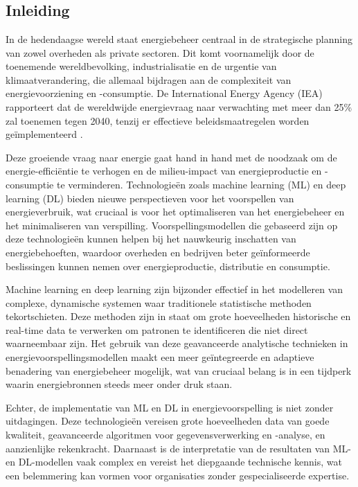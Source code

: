 \chapter{}%
\label{ch:stand-van-zaken}

\section{Inleiding}

In de hedendaagse wereld staat energiebeheer centraal in de strategische planning van zowel overheden als private sectoren. Dit komt voornamelijk door de toenemende wereldbevolking, industrialisatie en de urgentie van klimaatverandering, die allemaal bijdragen aan de complexiteit van energievoorziening en -consumptie. De International Energy Agency (IEA) rapporteert dat de wereldwijde energievraag naar verwachting met meer dan 25\% zal toenemen tegen 2040, tenzij er effectieve beleidsmaatregelen worden geïmplementeerd \autocite{Reddy_2023}.

Deze groeiende vraag naar energie gaat hand in hand met de noodzaak om de energie-efficiëntie te verhogen en de milieu-impact van energieproductie en -consumptie te verminderen. Technologieën zoals machine learning (ML) en deep learning (DL) bieden nieuwe perspectieven voor het voorspellen van energieverbruik, wat cruciaal is voor het optimaliseren van het energiebeheer en het minimaliseren van verspilling. Voorspellingsmodellen die gebaseerd zijn op deze technologieën kunnen helpen bij het nauwkeurig inschatten van energiebehoeften, waardoor overheden en bedrijven beter geïnformeerde beslissingen kunnen nemen over energieproductie, distributie en consumptie.

Machine learning en deep learning zijn bijzonder effectief in het modelleren van complexe, dynamische systemen waar traditionele statistische methoden tekortschieten. Deze methoden zijn in staat om grote hoeveelheden historische en real-time data te verwerken om patronen te identificeren die niet direct waarneembaar zijn. Het gebruik van deze geavanceerde analytische technieken in energievoorspellingsmodellen maakt een meer geïntegreerde en adaptieve benadering van energiebeheer mogelijk, wat van cruciaal belang is in een tijdperk waarin energiebronnen steeds meer onder druk staan.

Echter, de implementatie van ML en DL in energievoorspelling is niet zonder uitdagingen. Deze technologieën vereisen grote hoeveelheden data van goede kwaliteit, geavanceerde algoritmen voor gegevensverwerking en -analyse, en aanzienlijke rekenkracht. Daarnaast is de interpretatie van de resultaten van ML- en DL-modellen vaak complex en vereist het diepgaande technische kennis, wat een belemmering kan vormen voor organisaties zonder gespecialiseerde expertise.

